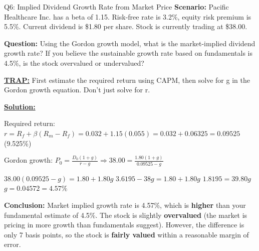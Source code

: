 \documentclass{beamer}
\renewcommand{\scriptsize}{\fontsize{6pt}{7pt}\selectfont}
\begin{document}
	\begin{frame}{Q6: Implied Dividend Growth Rate from Market Price}
		\scriptsize
		\textbf{Scenario:} Pacific Healthcare Inc. has a beta of 1.15. Risk-free rate is 3.2\%, equity risk premium is 5.5\%. Current dividend is \$1.80 per share. Stock is currently trading at \$38.00.
		
		\textbf{Question:} Using the Gordon growth model, what is the market-implied dividend growth rate? If you believe the sustainable growth rate based on fundamentals is 4.5\%, is the stock overvalued or undervalued?
		
		\vspace{2pt}
		\underline{\textbf{TRAP:}} First estimate the required return using CAPM, then solve for g in the Gordon growth equation. Don't just solve for r.
		
		\vspace{4pt}
		\underline{\textbf{Solution:}}
		
		Required return: $r = R_f + \beta(R_m - R_f) = 0.032 + 1.15(0.055) = 0.032 + 0.06325 = 0.09525$ (9.525\%)
		
		\vspace{2pt}
		Gordon growth: $P_0 = \frac{D_0(1+g)}{r-g} \Rightarrow 38.00 = \frac{1.80(1+g)}{0.09525-g}$
		
		$38.00(0.09525-g) = 1.80 + 1.80g$
		$3.6195 - 38g = 1.80 + 1.80g$
		$1.8195 = 39.80g$
		$g = 0.04572 = 4.57\%$
		
		\vspace{2pt}
		\textbf{Conclusion:} Market implied growth rate is 4.57\%, which is \textbf{higher} than your fundamental estimate of 4.5\%. The stock is slightly \textbf{overvalued} (the market is pricing in more growth than fundamentals suggest). However, the difference is only 7 basis points, so the stock is \textbf{fairly valued} within a reasonable margin of error.
	\end{frame}
	
\end{document}
